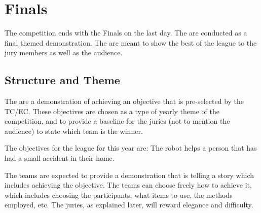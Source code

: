 \chapter{Finals}
\label{chap:finals}

The competition ends with the Finals on the last day.
The  are conducted as a final themed demonstration.
The  are meant to show the best of the league to the jury members as well as the audience.

\section{Structure and Theme}

The  are a demonstration of achieving an objective that is pre-selected by the TC/EC. These objectives are chosen as a type of yearly theme of the competition, and to provide a baseline for the juries (not to mention the audience) to state which team is the winner.

The objectives for the league for this year are:
The robot helps a person that has had a small accident in their home.



The teams are expected to provide a demonstration that is telling a story which includes achieving the objective. The teams can choose freely how to achieve it, which includes choosing the participants, what items to use, the methods employed, etc. The juries, as explained later, will reward elegance and difficulty.

